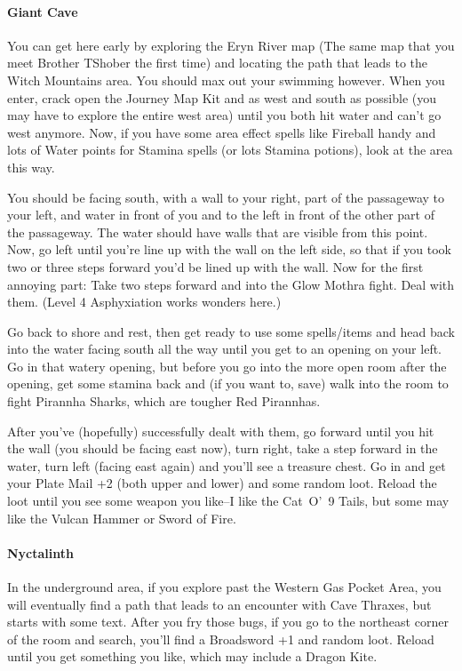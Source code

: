 \documentclass[12pt]{article}
\let\oldparagraph\paragraph
\renewcommand{\paragraph}[1]{\oldparagraph{#1}\mbox{}}
\begin{document}
\paragraph{Giant Cave} You can get here early by exploring the Eryn River map (The
same map that you meet Brother TShober the first time) and locating the
path that leads to the Witch Mountains area. You should max out your
swimming however. When you enter, crack open the Journey Map Kit and as
west and south as possible (you may have to explore the entire west
area) until you both hit water and can't go west anymore. Now, if you
have some area effect spells like Fireball handy and lots of Water
points for Stamina spells (or lots Stamina potions), look at the area
this way.

You should be facing south, with a wall to your right, part of the passageway
to your left, and water in front of you and to the left in front of the other
part of the passageway.  The water should have walls that are visible from
this point.  Now, go left until you're line up with the wall on the left
side, so that if you took two or three steps forward you'd be lined up with
the wall.  Now for the first annoying part: Take two steps forward and into
the Glow Mothra fight.  Deal with them.  (Level 4 Asphyxiation works wonders
here.)

Go back to shore and rest, then get ready to use some spells/items and head
back into the water facing south all the way until you get to an opening on
your left.  Go in that watery opening, but before you go into the more open
room after the opening, get some stamina back and (if you want to, save) walk
into the room to fight Pirannha Sharks, which are tougher Red Pirannhas.

After you've (hopefully) successfully dealt with them, go forward until you
hit the wall (you should be facing east now), turn right, take a step forward
in the water, turn left (facing east again) and you'll see a treasure chest.
Go in and get your Plate Mail +2 (both upper and lower) and some random loot.
Reload the loot until you see some weapon you like--I like the Cat~O'~9
Tails, but some may like the Vulcan Hammer or Sword of Fire.

\paragraph{Nyctalinth} In the underground area, if you explore past the
Western Gas Pocket Area, you will eventually find a path that leads to an
encounter with Cave Thraxes, but starts with some text. After you fry those
bugs, if you go to the northeast corner of the room and search, you'll find a
Broadsword +1 and random loot. Reload until you get something you like, which
may include a Dragon Kite.
\end{document}
